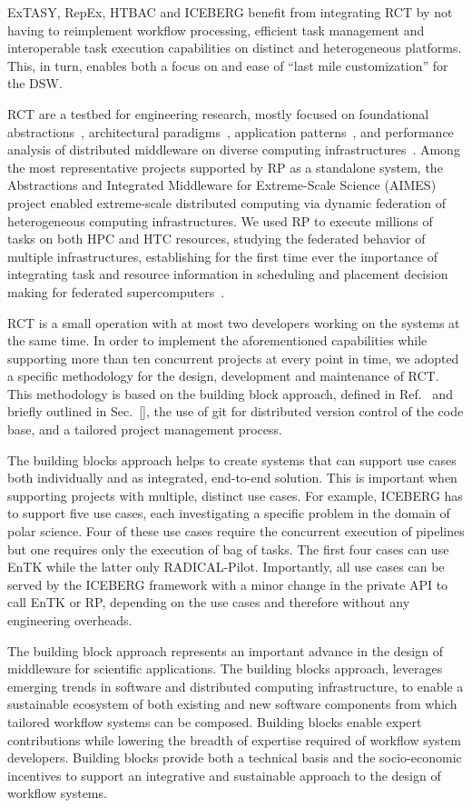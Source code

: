 \documentclass[preprint,12pt, a4paper]{elsarticle}
\begin{document}
ExTASY, RepEx, HTBAC and ICEBERG benefit from integrating RCT by not having
to reimplement workflow processing, efficient task management and
interoperable task execution capabilities on distinct and heterogeneous
platforms. This, in turn, enables both a focus on and ease of ``last mile
customization'' for the DSW\@.

RCT are a testbed for engineering research, mostly focused on foundational
abstractions~\cite{}, architectural paradigms~\cite{}, application
patterns~\cite{}, and performance analysis of distributed middleware on
diverse computing infrastructures~\cite{}. Among the most representative
projects supported by RP as a standalone system, the Abstractions and
Integrated Middleware for Extreme-Scale Science (AIMES) project enabled
extreme-scale distributed computing via dynamic federation of heterogeneous
computing infrastructures. We used RP to execute millions of tasks on both
HPC and HTC resources, studying the federated behavior of multiple
infrastructures, establishing for the first time ever the importance of
integrating task and resource information in scheduling and placement
decision making for federated supercomputers~\cite{}.

RCT is a small operation with at most two developers working on the systems
at the same time. In order to implement the aforementioned capabilities while
supporting more than ten concurrent projects at every point in time, we
adopted a specific methodology for the design, development and maintenance of
RCT. This methodology is based on the building block approach, defined in
Ref.~\cite{bb} and briefly outlined in Sec.~\ref{}, the use of git for
distributed version control of the code base, and a tailored project
management process.

The building blocks approach helps to create systems that can support use
cases both individually and as integrated, end-to-end solution. This is
important when supporting projects with multiple, distinct use cases. For
example, ICEBERG has to support five use cases, each investigating a specific
problem in the domain of polar science. Four of these use cases require the
concurrent execution of pipelines but one requires only the execution of bag
of tasks. The first four cases can use EnTK while the latter only
RADICAL-Pilot. Importantly, all use cases can be served by the ICEBERG
framework with a minor change in the private API to call EnTK or RP,
depending on the use cases and therefore without any engineering overheads.

The building block approach represents an important advance in the design of
middleware for scientific applications. The building blocks approach,
leverages emerging trends in software and distributed computing
infrastructure, to enable a sustainable ecosystem of both existing and new
software components from which tailored workflow systems can be composed.
Building blocks enable expert contributions while lowering the breadth of
expertise required of workflow system developers. Building blocks provide
both a technical basis and the socio-economic incentives to support an
integrative and sustainable approach to the design of workflow systems.
\end{document}
